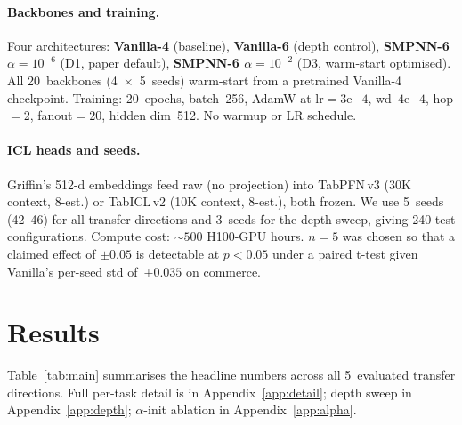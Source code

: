 \documentclass{article}
\begin{document}
\paragraph{Backbones and training.}
Four architectures: \textbf{Vanilla-4} (baseline), \textbf{Vanilla-6} (depth control), \textbf{SMPNN-6 $\alpha{=}10^{-6}$} (D1, paper default), \textbf{SMPNN-6 $\alpha{=}10^{-2}$} (D3, warm-start optimised). All 20~backbones (4~$\times$~5~seeds) warm-start from a pretrained Vanilla-4 checkpoint. Training: 20~epochs, batch~256, AdamW at $\text{lr}{=}3\text{e}{-4}$, wd~$4\text{e}{-4}$, hop$=$2, fanout$=$20, hidden dim~512. No warmup or LR schedule.

\paragraph{ICL heads and seeds.}
Griffin's 512-d embeddings feed raw (no projection) into TabPFN\,v3 (30K context, 8-est.) or TabICL\,v2 (10K context, 8-est.), both frozen. We use 5~seeds (42--46) for all transfer directions and 3~seeds for the depth sweep, giving 240 test configurations. Compute cost: ${\sim}500$ H100-GPU hours. $n{=}5$ was chosen so that a claimed effect of ${\pm}0.05$ is detectable at $p{<}0.05$ under a paired t-test given Vanilla's per-seed std of~${\pm}0.035$ on commerce.

\section{Results}
\label{sec:results}

Table~\ref{tab:main} summarises the headline numbers across all 5~evaluated transfer directions. Full per-task detail is in Appendix~\ref{app:detail}; depth sweep in Appendix~\ref{app:depth}; $\alpha$-init ablation in Appendix~\ref{app:alpha}.
\end{document}

